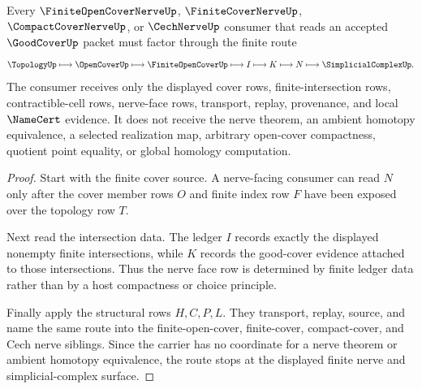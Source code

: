 \begin{theorem}
\label{thm:good-cover-finite-intersection-nerve-route}
Every $\FiniteOpenCoverNerveUp$, $\FiniteCoverNerveUp$, $\CompactCoverNerveUp$, or $\CechNerveUp$ consumer that reads an accepted $\GoodCoverUp$ packet must factor through the finite route
$$
\TopologyUp \longmapsto \OpenCoverUp \longmapsto \FiniteOpenCoverUp \longmapsto I \longmapsto K \longmapsto N \longmapsto \SimplicialComplexUp .
$$
The consumer receives only the displayed cover rows, finite-intersection rows, contractible-cell rows, nerve-face rows, transport, replay, provenance, and local $\NameCert$ evidence. It does not receive the nerve theorem, an ambient homotopy equivalence, a selected realization map, arbitrary open-cover compactness, quotient point equality, or global homology computation.
\end{theorem}
\begin{proof}
Start with the finite cover source. A nerve-facing consumer can read $N$ only after the cover member rows $O$ and finite index row $F$ have been exposed over the topology row $T$.

Next read the intersection data. The ledger $I$ records exactly the displayed nonempty finite intersections, while $K$ records the good-cover evidence attached to those intersections. Thus the nerve face row is determined by finite ledger data rather than by a host compactness or choice principle.

Finally apply the structural rows $H,C,P,L$. They transport, replay, source, and name the same route into the finite-open-cover, finite-cover, compact-cover, and Cech nerve siblings. Since the carrier has no coordinate for a nerve theorem or ambient homotopy equivalence, the route stops at the displayed finite nerve and simplicial-complex surface.
\end{proof}



